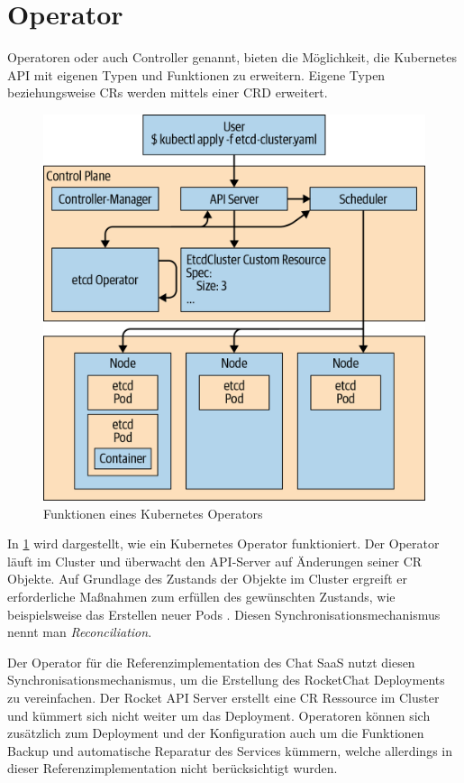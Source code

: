 \section{Operator}
\label{sec:komponenten:operator}

Operatoren oder auch Controller genannt, bieten die Möglichkeit, die Kubernetes API mit eigenen Typen und Funktionen zu erweitern.
Eigene Typen beziehungsweise \acp{CR} werden mittels einer \ac{CRD} erweitert.
\begin{figure}[h]
  \centering
  \includegraphics{gfx/chapters/3_komponenten/operator_example.png}
  \caption{Funktionen eines Kubernetes Operators}
  \label{fig:kubernetes_operator_example}
\end{figure}

In \ref{fig:kubernetes_operator_example} wird dargestellt, wie ein Kubernetes Operator funktioniert. Der Operator läuft im Cluster und
überwacht den API-Server auf Änderungen seiner \ac{CR} Objekte. 
Auf Grundlage des Zustands der Objekte im Cluster ergreift er erforderliche Maßnahmen zum erfüllen des gewünschten Zustands, 
wie beispielsweise das Erstellen neuer Pods \cite{Dobies2020}.
Diesen Synchronisationsmechanismus nennt man \emph{Reconciliation}.

Der Operator für die Referenzimplementation des Chat \ac{SaaS} nutzt diesen Synchronisationsmechanismus, um die Erstellung des RocketChat
Deployments zu vereinfachen. Der Rocket API Server erstellt eine \ac{CR} Ressource im Cluster und kümmert sich nicht weiter um 
das Deployment. Operatoren können sich zusätzlich zum Deployment und der Konfiguration auch um die Funktionen Backup 
und automatische Reparatur des Services kümmern\cite{Dobies2020}, welche allerdings in dieser Referenzimplementation 
nicht berücksichtigt wurden.

